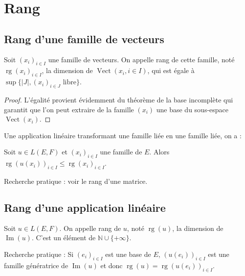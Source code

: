 \section{Rang}

\subsection{Rang d'une famille de vecteurs}

\begin{de}
Soit $(x_i)_{i\in I}$ une famille de vecteurs. On appelle rang de cette famille, noté $\operatorname{rg}(x_i)_{i\in I}$, la dimension de $\operatorname{Vect}(x_i, i\in I)$, qui est égale à $\sup\{|J|, (x_i)_{i\in J} \text{ libre}\}$.
\end{de}

\begin{proof}
L'égalité provient évidemment du théorème de la base incomplète qui garantit que l'on peut extraire de la famille $(x_i)$ une base du sous-espace $\operatorname{Vect}(x_i)$.
\end{proof}

Une application linéaire transformant une famille liée en une famille liée, on a :

\begin{thm}
Soit $u \in L(E,F)$ et $(x_i)_{i\in I}$ une famille de $E$. Alors $\operatorname{rg}(u(x_i))_{i\in I} \leq \operatorname{rg}(x_i)_{i\in I}$.
\end{thm}

\begin{rem}
Recherche pratique : voir le rang d'une matrice.
\end{rem}

\subsection{Rang d'une application linéaire}

\begin{de}
Soit $u \in L(E,F)$. On appelle rang de $u$, noté $\operatorname{rg}(u)$, la dimension de $\operatorname{Im}(u)$. C'est un élément de $\mathbb{N} \cup \{+\infty\}$.
\end{de}

\begin{rem}
Recherche pratique : Si $(e_i)_{i\in I}$ est une base de $E$, $(u(e_i))_{i\in I}$ est une famille génératrice de $\operatorname{Im}(u)$ et donc $\operatorname{rg}(u) = \operatorname{rg}(u(e_i))_{i\in I}$.
\end{rem}

